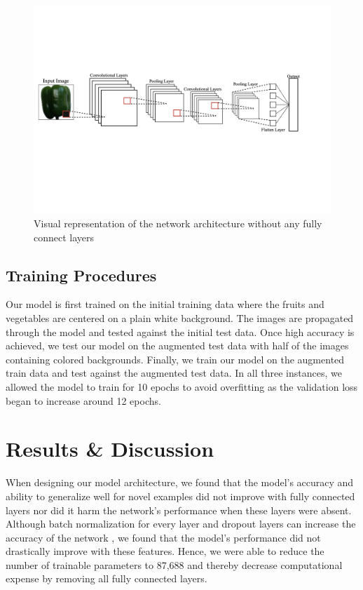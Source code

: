 \documentclass[11pt]{article}
\begin{document}
\begin{figure}[h]
\begin{center}
\includegraphics[scale=0.7, trim={0 6cm 0 5cm}, clip]{Project CNN Architecture.png}
\end{center}
\caption{Visual representation of the network architecture without any fully connect layers}
\label{network}
\end{figure}


\subsection{Training Procedures}
Our model is first trained on the initial training data where the fruits and vegetables are centered on a plain white background. The images are propagated through the model and tested against the initial test data. Once high accuracy is achieved, we test our model on the augmented test data with half of the images containing colored backgrounds. Finally, we train our model on the augmented train data and test against the augmented test data. In all three instances, we allowed the model to train for 10 epochs to avoid overfitting as the validation loss began to increase around 12 epochs. 

\section{Results \& Discussion}
When designing our model architecture, we found that the model's accuracy and ability to generalize well for novel examples did not improve with fully connected layers nor did it harm the network's performance when these layers were absent. Although batch normalization for every layer \cite{krizhevsky2012imagenet} and dropout layers can increase the accuracy of the network \cite{krizhevsky2012imagenet}, we found that the model's performance did not drastically improve with these features. Hence, we were able to reduce the number of trainable parameters to 87,688 and thereby decrease computational expense by removing all fully connected layers.
\end{document}
